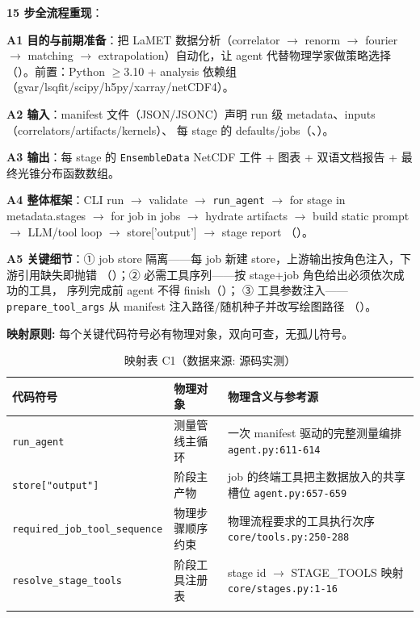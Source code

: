 \documentclass[UTF8]{ctexart}
\begin{document}
\textbf{15 步全流程重现}：

\textbf{A1 目的与前期准备}：把 LaMET 数据分析（correlator $\to$ renorm $\to$ fourier $\to$ matching $\to$ extrapolation）自动化，让 agent 代替物理学家做策略选择
（\texttt{}）。前置：Python $\ge$3.10 + analysis 依赖组（gvar/lsqfit/scipy/h5py/xarray/netCDF4）。

\textbf{A2 输入}：manifest 文件（JSON/JSONC）声明 run 级 metadata、inputs（correlators/artifacts/kernels）、
每 stage 的 defaults/jobs（\texttt{}、\texttt{}）。

\textbf{A3 输出}：每 stage 的 \texttt{EnsembleData} NetCDF 工件 + 图表 + 双语文档报告 + 最终光锥分布函数数组。

\textbf{A4 整体框架}：CLI run $\to$ validate $\to$ \texttt{run\_agent} $\to$ for stage in metadata.stages $\to$
for job in jobs $\to$ hydrate artifacts $\to$ build static prompt $\to$ LLM/tool loop $\to$ store['output'] $\to$ stage report
（\texttt{}）。

\textbf{A5 关键细节}：① job store 隔离——每 job 新建 store，上游输出按角色注入，下游引用缺失即抛错
（\texttt{}）；② 必需工具序列——按 stage+job 角色给出必须依次成功的工具，
序列完成前 agent 不得 finish（\texttt{}）；
③ 工具参数注入——\texttt{prepare\_tool\_args} 从 manifest 注入路径/随机种子并改写绘图路径
（\texttt{}）。

\begin{mapbox}
\textbf{映射原则:} 每个关键代码符号必有物理对象，双向可查，无孤儿符号。
\end{mapbox}
\begin{xltabular}{\textwidth}{lXX}
\toprule
\textcolor{map}{代码符号} & 物理对象 & 物理含义与参考源 \\
\midrule
\endhead
\texttt{\nolinkurl{run_agent}} & 测量管线主循环 & 一次 manifest 驱动的完整测量编排 \texttt{\nolinkurl{agent.py:611-614}} \\
\texttt{\nolinkurl{store["output"]}} & 阶段主产物 & job 的终端工具把主数据放入的共享槽位 \texttt{\nolinkurl{agent.py:657-659}} \\
\texttt{\nolinkurl{required_job_tool_sequence}} & 物理步骤顺序约束 & 物理流程要求的工具执行次序 \texttt{\nolinkurl{core/tools.py:250-288}} \\
\texttt{\nolinkurl{resolve_stage_tools}} & 阶段工具注册表 & stage id $\to$ STAGE\_TOOLS 映射 \texttt{\nolinkurl{core/stages.py:1-16}} \\
\bottomrule
\caption{映射表 C1（数据来源: 源码实测）}
\end{xltabular}
\end{document}
